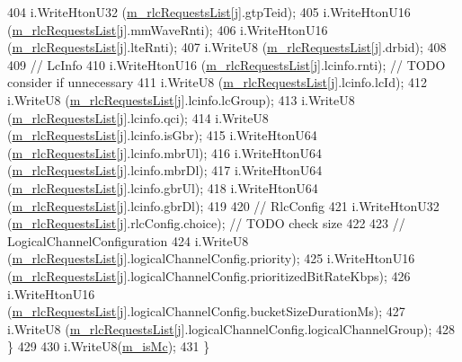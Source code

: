 \begin{DoxyCode}
404     i.WriteHtonU32 (\hyperlink{classns3_1_1EpcX2HandoverRequestHeader_ac480cbca8380b8667096efeac4e2fa0c}{m\_rlcRequestsList}[j].gtpTeid); 
405     i.WriteHtonU16 (\hyperlink{classns3_1_1EpcX2HandoverRequestHeader_ac480cbca8380b8667096efeac4e2fa0c}{m\_rlcRequestsList}[j].mmWaveRnti); 
406     i.WriteHtonU16 (\hyperlink{classns3_1_1EpcX2HandoverRequestHeader_ac480cbca8380b8667096efeac4e2fa0c}{m\_rlcRequestsList}[j].lteRnti);
407     i.WriteU8 (\hyperlink{classns3_1_1EpcX2HandoverRequestHeader_ac480cbca8380b8667096efeac4e2fa0c}{m\_rlcRequestsList}[j].drbid);
408 
409     \textcolor{comment}{// LcInfo}
410     i.WriteHtonU16  (\hyperlink{classns3_1_1EpcX2HandoverRequestHeader_ac480cbca8380b8667096efeac4e2fa0c}{m\_rlcRequestsList}[j].lcinfo.rnti); \textcolor{comment}{// TODO consider if unnecessary}
411     i.WriteU8       (\hyperlink{classns3_1_1EpcX2HandoverRequestHeader_ac480cbca8380b8667096efeac4e2fa0c}{m\_rlcRequestsList}[j].lcinfo.lcId);
412     i.WriteU8       (\hyperlink{classns3_1_1EpcX2HandoverRequestHeader_ac480cbca8380b8667096efeac4e2fa0c}{m\_rlcRequestsList}[j].lcinfo.lcGroup);
413     i.WriteU8       (\hyperlink{classns3_1_1EpcX2HandoverRequestHeader_ac480cbca8380b8667096efeac4e2fa0c}{m\_rlcRequestsList}[j].lcinfo.qci);
414     i.WriteU8       (\hyperlink{classns3_1_1EpcX2HandoverRequestHeader_ac480cbca8380b8667096efeac4e2fa0c}{m\_rlcRequestsList}[j].lcinfo.isGbr);
415     i.WriteHtonU64  (\hyperlink{classns3_1_1EpcX2HandoverRequestHeader_ac480cbca8380b8667096efeac4e2fa0c}{m\_rlcRequestsList}[j].lcinfo.mbrUl);
416     i.WriteHtonU64  (\hyperlink{classns3_1_1EpcX2HandoverRequestHeader_ac480cbca8380b8667096efeac4e2fa0c}{m\_rlcRequestsList}[j].lcinfo.mbrDl);
417     i.WriteHtonU64  (\hyperlink{classns3_1_1EpcX2HandoverRequestHeader_ac480cbca8380b8667096efeac4e2fa0c}{m\_rlcRequestsList}[j].lcinfo.gbrUl);
418     i.WriteHtonU64  (\hyperlink{classns3_1_1EpcX2HandoverRequestHeader_ac480cbca8380b8667096efeac4e2fa0c}{m\_rlcRequestsList}[j].lcinfo.gbrDl);
419 
420     \textcolor{comment}{// RlcConfig}
421     i.WriteHtonU32 (\hyperlink{classns3_1_1EpcX2HandoverRequestHeader_ac480cbca8380b8667096efeac4e2fa0c}{m\_rlcRequestsList}[j].rlcConfig.choice); \textcolor{comment}{// TODO check size}
422 
423     \textcolor{comment}{// LogicalChannelConfiguration}
424     i.WriteU8      (\hyperlink{classns3_1_1EpcX2HandoverRequestHeader_ac480cbca8380b8667096efeac4e2fa0c}{m\_rlcRequestsList}[j].logicalChannelConfig.priority);
425     i.WriteHtonU16 (\hyperlink{classns3_1_1EpcX2HandoverRequestHeader_ac480cbca8380b8667096efeac4e2fa0c}{m\_rlcRequestsList}[j].logicalChannelConfig.prioritizedBitRateKbps);
426     i.WriteHtonU16 (\hyperlink{classns3_1_1EpcX2HandoverRequestHeader_ac480cbca8380b8667096efeac4e2fa0c}{m\_rlcRequestsList}[j].logicalChannelConfig.bucketSizeDurationMs);
427     i.WriteU8      (\hyperlink{classns3_1_1EpcX2HandoverRequestHeader_ac480cbca8380b8667096efeac4e2fa0c}{m\_rlcRequestsList}[j].logicalChannelConfig.logicalChannelGroup);
428   \}
429 
430   i.WriteU8(\hyperlink{classns3_1_1EpcX2HandoverRequestHeader_a2195d578c9065fa66c045243eeeed7c7}{m\_isMc});
431 \}
\end{DoxyCode}


